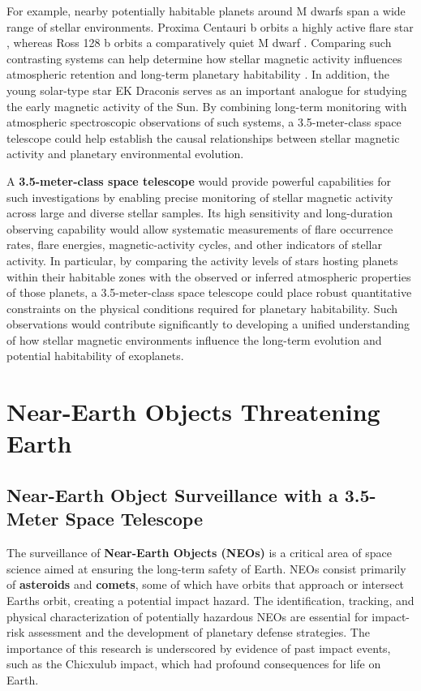 For example, nearby potentially habitable planets around M dwarfs span a wide
range of stellar environments. Proxima Centauri b orbits a highly active flare
star \cite{davenport2016}, whereas Ross 128 b orbits a comparatively quiet
M dwarf \cite{bonfils2018}. Comparing such contrasting systems can help
determine how stellar magnetic activity influences atmospheric retention
and long-term planetary habitability \cite{chen2021}. In addition, the young solar-type star EK Draconis serves as an important analogue for studying the early magnetic activity of the Sun. By combining long-term monitoring with atmospheric spectroscopic observations of such systems, a 3.5-meter-class space telescope could help establish the causal relationships between stellar magnetic activity and planetary environmental evolution.

A \textbf{3.5-meter-class space telescope} would provide powerful capabilities for such investigations by enabling precise monitoring of stellar magnetic activity across large and diverse stellar samples. Its high sensitivity and long-duration observing capability would allow systematic measurements of flare occurrence rates, flare energies, magnetic-activity cycles, and other indicators of stellar activity. In particular, by comparing the activity levels of stars hosting planets within their habitable zones with the observed or inferred atmospheric properties of those planets, a 3.5-meter-class space telescope could place robust quantitative constraints on the physical conditions required for planetary habitability. Such observations would contribute significantly to developing a unified understanding of how stellar magnetic environments influence the long-term evolution and potential habitability of exoplanets.

\section{Near-Earth Objects Threatening Earth}\label{near-earth-objects-threatening-earth}

\subsection{Near-Earth Object Surveillance with a 3.5-Meter Space Telescope}\label{near-earth-object-surveillance-with-a-3.5-meter-space-telescope}

The surveillance of \textbf{Near-Earth Objects (NEOs)} is a critical area of space science aimed at ensuring the long-term safety of Earth. NEOs consist primarily of \textbf{asteroids} and \textbf{comets}, some of which have orbits that approach or intersect Earth\textquotesingle s orbit, creating a potential impact hazard. The identification, tracking, and physical characterization of potentially hazardous NEOs are essential for impact-risk assessment and the development of planetary defense strategies. The importance of this research is underscored by evidence of past impact events, such as the Chicxulub impact, which had profound consequences for life on Earth.

